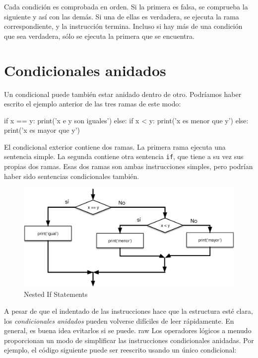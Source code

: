 Cada condición es comprobada en orden. Si la primera es falsa, se
comprueba la siguiente y así con las demás. Si una de ellas es
verdadera, se ejecuta la rama correspondiente, y la instrucción termina.
Incluso si hay más de una condición que sea verdadera, sólo se ejecuta
la primera que se encuentra.

\hypertarget{condicionales-anidados}{%
\section{Condicionales anidados}\label{condicionales-anidados}}

 

Un condicional puede también estar anidado dentro de otro. Podríamos
haber escrito el ejemplo anterior de las tres ramas de este modo:

\begin{python}[frame=single]
if x == y:
    print('x e y son iguales')
else:
    if x < y:
        print('x es menor que y')
    else:
        print('x es mayor que y')
\end{python}

El condicional exterior contiene dos ramas. La primera rama ejecuta una
sentencia simple. La segunda contiene otra sentencia \texttt{if}, que
tiene a su vez sus propias dos ramas. Esas dos ramas son ambas
instrucciones simples, pero podrían haber sido sentencias condicionales
también.

\begin{figure}[t]
\centering
\includegraphics[width=\textwidth]{images/nested}
\caption{Nested If Statements}
\label{fig:nested}
\end{figure}

A pesar de que el indentado de las instrucciones hace que la estructura
esté clara, los \emph{condicionales anidados} pueden volverse difíciles
de leer rápidamente. En general, es buena idea evitarlos si se puede.
raw Los operadores lógicos a menudo proporcionan un modo de simplificar
las instrucciones condicionales anidadas. Por ejemplo, el código
siguiente puede ser reescrito usando un único condicional:

